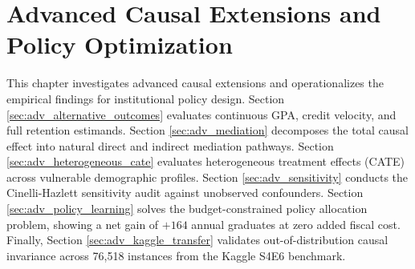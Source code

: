 \chapter{Advanced Causal Extensions and Policy Optimization}
\label{chap:advanced_analysis}

This chapter investigates advanced causal extensions and operationalizes the empirical findings for institutional policy design. Section \ref{sec:adv_alternative_outcomes} evaluates continuous GPA, credit velocity, and full retention estimands. Section \ref{sec:adv_mediation} decomposes the total causal effect into natural direct and indirect mediation pathways. Section \ref{sec:adv_heterogeneous_cate} evaluates heterogeneous treatment effects (CATE) across vulnerable demographic profiles. Section \ref{sec:adv_sensitivity} conducts the Cinelli-Hazlett sensitivity audit against unobserved confounders. Section \ref{sec:adv_policy_learning} solves the budget-constrained policy allocation problem, showing a net gain of $+164$ annual graduates at zero added fiscal cost. Finally, Section \ref{sec:adv_kaggle_transfer} validates out-of-distribution causal invariance across 76,518 instances from the Kaggle S4E6 benchmark.







